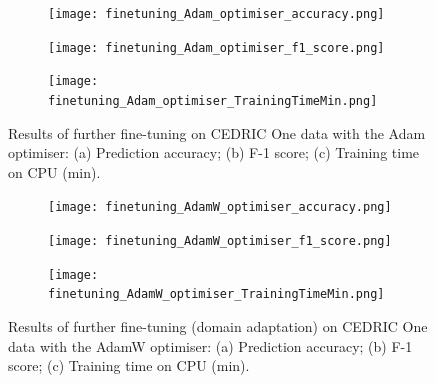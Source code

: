 \documentclass[a4paper,12pt]{article}
\newcommand{\figwidthh}{0.48\textwidth}
\newcommand{\inghamOne}{CEDRIC One\xspace}   %
\begin{document}
\begin{figure}[h!]
	\begin{center}
		\begin{subfigure}[b]{\figwidthh}
			\caption{} 
			\texttt{[image: finetuning\_Adam\_optimiser\_accuracy.png]}
		\end{subfigure}
        \hfill
		\begin{subfigure}[b]{\figwidthh}
			\caption{}
			\texttt{[image: finetuning\_Adam\_optimiser\_f1\_score.png]}
		\end{subfigure}
        \hfill
		\begin{subfigure}[b]{\figwidthh}
			\caption{}
			\texttt{[image: finetuning\_Adam\_optimiser\_TrainingTimeMin.png]}
		\end{subfigure}
	\end{center}                                                                
	\caption{Results of further fine-tuning on \inghamOne data with the Adam optimiser: (a) Prediction accuracy; (b) F-1 score; (c) Training time on CPU (min).
	} 
	\label{fig:res_domainAdaptation_adam}
\end{figure}



\begin{figure}[ht]
	\begin{center}
		\begin{subfigure}[b]{\figwidthh}
			\caption{} 
			\texttt{[image: finetuning\_AdamW\_optimiser\_accuracy.png]}
		\end{subfigure}
        \hfill
		\begin{subfigure}[b]{\figwidthh}
			\caption{}
			\texttt{[image: finetuning\_AdamW\_optimiser\_f1\_score.png]}
		\end{subfigure}
        \hfill
		\begin{subfigure}[b]{\figwidthh}
			\caption{}
			\texttt{[image: finetuning\_AdamW\_optimiser\_TrainingTimeMin.png]}
		\end{subfigure}
	\end{center}
	\caption{Results of further fine-tuning (domain adaptation) on \inghamOne data with the AdamW optimiser: (a) Prediction accuracy; (b) F-1 score; (c) Training time on CPU (min).
	} 
	\label{fig:res_domainAdaptation_adamW}
\end{figure}



\clearpage
\newpage
\end{document}
